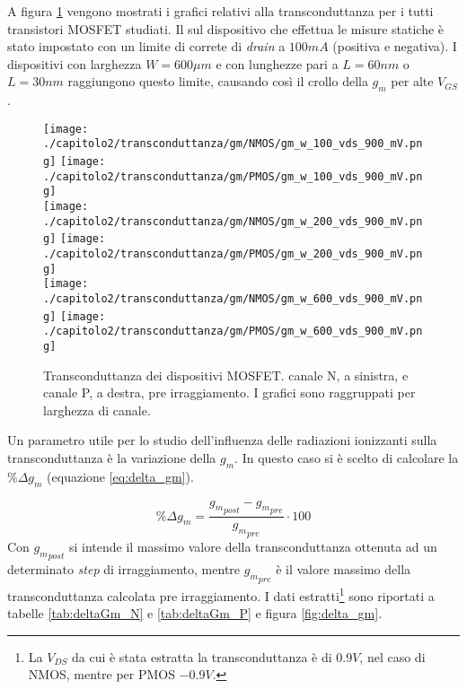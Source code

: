 \vspace{0.5cm}

A figura \ref{fig:gm_w} vengono mostrati i grafici relativi alla transconduttanza per i tutti transistori MOSFET studiati. Il sul dispositivo che effettua le misure statiche è stato impostato con un limite di correte di \emph{drain} a $100mA$ (positiva e negativa). I dispositivi con larghezza $W = 600\mu m$ e con lunghezze pari a $L = 60nm$ o $L = 30nm$ raggiungono questo limite, causando così il crollo della $g_m$ per alte $V_{GS}$.

\begin{figure}[t]
    \centering
    \texttt{[image: ./capitolo2/transconduttanza/gm/NMOS/gm\_w\_100\_vds\_900\_mV.png]}
    \texttt{[image: ./capitolo2/transconduttanza/gm/PMOS/gm\_w\_100\_vds\_900\_mV.png]}\\
    \vspace{0.2cm}
    \texttt{[image: ./capitolo2/transconduttanza/gm/NMOS/gm\_w\_200\_vds\_900\_mV.png]}
    \texttt{[image: ./capitolo2/transconduttanza/gm/PMOS/gm\_w\_200\_vds\_900\_mV.png]}\\
    \vspace{0.2cm}
    \texttt{[image: ./capitolo2/transconduttanza/gm/NMOS/gm\_w\_600\_vds\_900\_mV.png]}
    \texttt{[image: ./capitolo2/transconduttanza/gm/PMOS/gm\_w\_600\_vds\_900\_mV.png]}

    \caption[Dati $g_m$ estratti pre-irraggiamento]{Transconduttanza dei dispositivi MOSFET. canale N, a sinistra, e canale P, a destra, pre irraggiamento. I grafici sono raggruppati per larghezza di canale.}
    \label{fig:gm_w}

\end{figure}


\vspace{0.5cm}


Un parametro utile per lo studio dell'influenza delle radiazioni ionizzanti sulla transconduttanza è  la variazione della $g_m$. In questo caso si è scelto di calcolare la $ \% \Delta g_m $ (equazione \ref{eq:delta_gm}). 

\begin{equation}
    {\%} \Delta {g_m}  = \frac{{g_m}_{post} - {g_m}_{pre}}{{g_m}_{pre}}\cdot 100
    \label{eq:delta_gm}
\end{equation}
Con ${g_m}_{post}$ si intende il massimo valore della transconduttanza ottenuta ad un determinato \emph{step} di irraggiamento, mentre ${g_m}_{pre}$ è il valore massimo della transconduttanza calcolata pre irraggiamento. I dati estratti\footnote{La $V_{DS}$ da cui è stata estratta la transconduttanza è di $0.9V$, nel caso di NMOS, mentre per PMOS $-0.9V$.} sono riportati a tabelle \ref{tab:deltaGm_N} e \ref{tab:deltaGm_P} e figura \ref{fig:delta_gm}.

